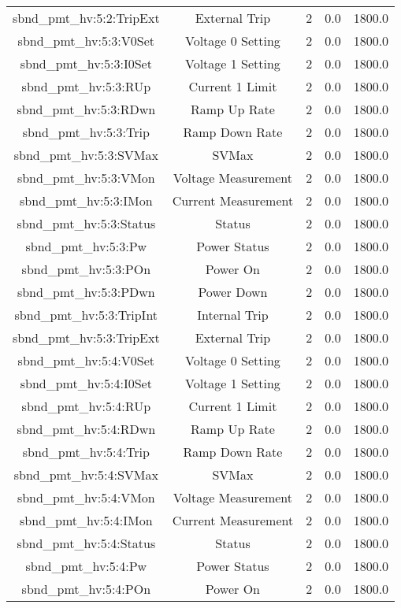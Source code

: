 \begin{center}
\begin{longtable}{c | c c c c }
sbnd\_pmt\_hv:5:2:TripExt & External Trip & 2 & 0.0 & 1800.0\\ 
sbnd\_pmt\_hv:5:3:V0Set & Voltage 0 Setting & 2 & 0.0 & 1800.0\\ 
sbnd\_pmt\_hv:5:3:I0Set & Voltage 1 Setting & 2 & 0.0 & 1800.0\\ 
sbnd\_pmt\_hv:5:3:RUp & Current 1 Limit & 2 & 0.0 & 1800.0\\ 
sbnd\_pmt\_hv:5:3:RDwn & Ramp Up Rate & 2 & 0.0 & 1800.0\\ 
sbnd\_pmt\_hv:5:3:Trip & Ramp Down Rate & 2 & 0.0 & 1800.0\\ 
sbnd\_pmt\_hv:5:3:SVMax & SVMax & 2 & 0.0 & 1800.0\\ 
sbnd\_pmt\_hv:5:3:VMon & Voltage Measurement & 2 & 0.0 & 1800.0\\ 
sbnd\_pmt\_hv:5:3:IMon & Current Measurement & 2 & 0.0 & 1800.0\\ 
sbnd\_pmt\_hv:5:3:Status & Status & 2 & 0.0 & 1800.0\\ 
sbnd\_pmt\_hv:5:3:Pw & Power Status & 2 & 0.0 & 1800.0\\ 
sbnd\_pmt\_hv:5:3:POn & Power On & 2 & 0.0 & 1800.0\\ 
sbnd\_pmt\_hv:5:3:PDwn & Power Down & 2 & 0.0 & 1800.0\\ 
sbnd\_pmt\_hv:5:3:TripInt & Internal Trip & 2 & 0.0 & 1800.0\\ 
sbnd\_pmt\_hv:5:3:TripExt & External Trip & 2 & 0.0 & 1800.0\\ 
sbnd\_pmt\_hv:5:4:V0Set & Voltage 0 Setting & 2 & 0.0 & 1800.0\\ 
sbnd\_pmt\_hv:5:4:I0Set & Voltage 1 Setting & 2 & 0.0 & 1800.0\\ 
sbnd\_pmt\_hv:5:4:RUp & Current 1 Limit & 2 & 0.0 & 1800.0\\ 
sbnd\_pmt\_hv:5:4:RDwn & Ramp Up Rate & 2 & 0.0 & 1800.0\\ 
sbnd\_pmt\_hv:5:4:Trip & Ramp Down Rate & 2 & 0.0 & 1800.0\\ 
sbnd\_pmt\_hv:5:4:SVMax & SVMax & 2 & 0.0 & 1800.0\\ 
sbnd\_pmt\_hv:5:4:VMon & Voltage Measurement & 2 & 0.0 & 1800.0\\ 
sbnd\_pmt\_hv:5:4:IMon & Current Measurement & 2 & 0.0 & 1800.0\\ 
sbnd\_pmt\_hv:5:4:Status & Status & 2 & 0.0 & 1800.0\\ 
sbnd\_pmt\_hv:5:4:Pw & Power Status & 2 & 0.0 & 1800.0\\ 
sbnd\_pmt\_hv:5:4:POn & Power On & 2 & 0.0 & 1800.0\\ 

\end{longtable}
\end{center}
